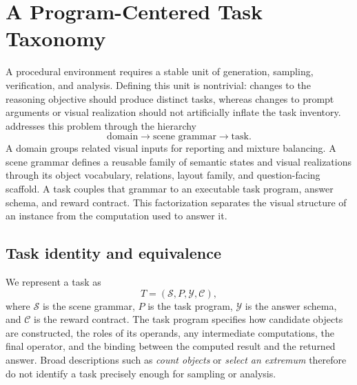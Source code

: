 \section{A Program-Centered Task Taxonomy}
\label{sec:taxonomy}

A procedural environment requires a stable unit of generation, sampling,
verification, and analysis. Defining this unit is nontrivial: changes to the
reasoning objective should produce distinct tasks, whereas changes to prompt
arguments or visual realization should not artificially inflate the task
inventory. \trace addresses this problem through the hierarchy
\begin{equation}
  \text{domain} \longrightarrow \text{scene grammar} \longrightarrow \text{task}.
  \label{eq:public-taxonomy}
\end{equation}
A domain groups related visual inputs for reporting and mixture balancing. A
scene grammar defines a reusable family of semantic states and visual
realizations through its object vocabulary, relations, layout family, and
question-facing scaffold. A task couples that grammar to an executable task
program, answer schema, and reward contract. This factorization separates the
visual structure of an instance from the computation used to answer it.

\subsection{Task identity and equivalence}

We represent a task as
\begin{equation}
  T = (\mathcal{S}, P, \mathcal{Y}, \mathcal{C}),
\end{equation}
where $\mathcal{S}$ is the scene grammar, $P$ is the task program,
$\mathcal{Y}$ is the answer schema, and $\mathcal{C}$ is the reward contract.
The task program specifies how candidate objects are constructed, the roles of
its operands, any intermediate computations, the final operator, and the
binding between the computed result and the returned answer. Broad descriptions
such as \textit{count objects} or \textit{select an extremum} therefore do not
identify a task precisely enough for sampling or analysis.

